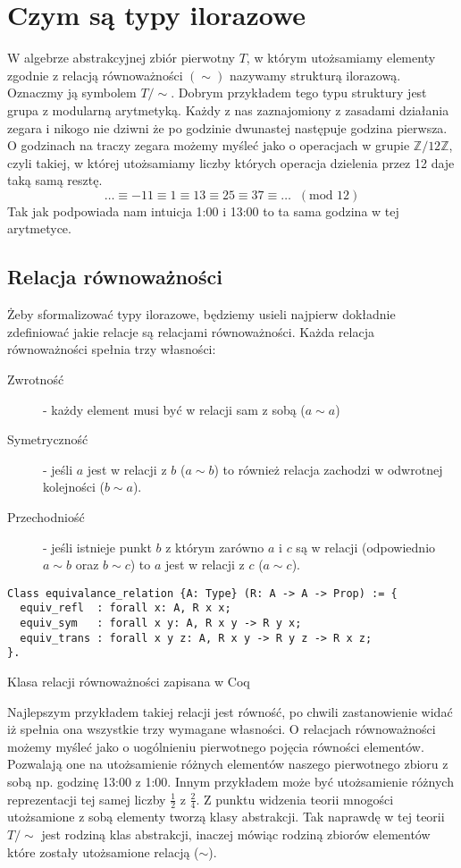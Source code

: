 \section{Czym są typy ilorazowe}
W algebrze abstrakcyjnej zbiór pierwotny $T$, w którym utożsamiamy elementy zgodnie z relacją równoważności $(\sim)$ nazywamy strukturą ilorazową. Oznaczmy ją symbolem $T/\sim$. Dobrym przykładem tego typu struktury jest grupa z modularną arytmetyką. Każdy z nas zaznajomiony z zasadami działania zegara i nikogo nie dziwni że po godzinie dwunastej następuje godzina pierwsza. O godzinach na traczy zegara możemy myśleć jako o operacjach w grupie $\mathbb{Z} / 12\mathbb{Z}$, czyli takiej, w której utożsamiamy liczby których operacja dzielenia przez 12 daje taką samą resztę.
\begin{equation}
\dots 	\equiv -11 	\equiv 1 \equiv 13 \equiv 25 \equiv 37 \equiv \dots \;\;(\textrm{mod } 12)
\label{mod_12}
\end{equation}
Tak jak podpowiada nam intuicja 1:00 i 13:00 to ta sama godzina w tej arytmetyce.
\subsection{Relacja równoważności}
Żeby sformalizować typy ilorazowe, będziemy usieli najpierw dokładnie zdefiniować jakie relacje są relacjami równoważności. Każda relacja równoważności spełnia trzy własności:
\begin{description}
    \item[Zwrotność] - każdy element musi być w relacji sam z sobą ($a \sim a$)
    \item[Symetryczność] - jeśli $a$ jest w relacji z $b$ ($a \sim b$) to również relacja zachodzi w odwrotnej kolejności  ($b \sim a$).
    \item[Przechodniość] - jeśli istnieje punkt $b$ z którym zarówno $a$ i $c$ są w relacji (odpowiednio $a \sim b$ oraz $b \sim c$) to $a$ jest w relacji z $c$ ($a \sim c$).
\end{description}
\begin{code}
\begin{verbatim}
Class equivalance_relation {A: Type} (R: A -> A -> Prop) := {
  equiv_refl  : forall x: A, R x x;
  equiv_sym   : forall x y: A, R x y -> R y x;
  equiv_trans : forall x y z: A, R x y -> R y z -> R x z;
}.
\end{verbatim}
\caption{Klasa relacji równoważności zapisana w Coq}
\label{equivalance_relation}
\end{code}
Najlepszym przykładem takiej relacji jest równość, po chwili zastanowienie widać iż spełnia ona wszystkie trzy wymagane własności. O relacjach równoważności możemy myśleć jako o uogólnieniu pierwotnego pojęcia równości elementów. Pozwalają one na utożsamienie różnych elementów naszego pierwotnego zbioru z sobą np. godzinę 13:00 z 1:00. Innym przykładem może być utożsamienie różnych reprezentacji tej samej liczby $\frac{1}{2}$ z $\frac{2}{4}$. Z punktu widzenia teorii mnogości utożsamione z sobą elementy tworzą klasy abstrakcji. Tak naprawdę w tej teorii $T/\sim$ jest rodziną klas abstrakcji, inaczej mówiąc rodziną zbiorów elementów które zostały utożsamione relacją ($\sim$).

